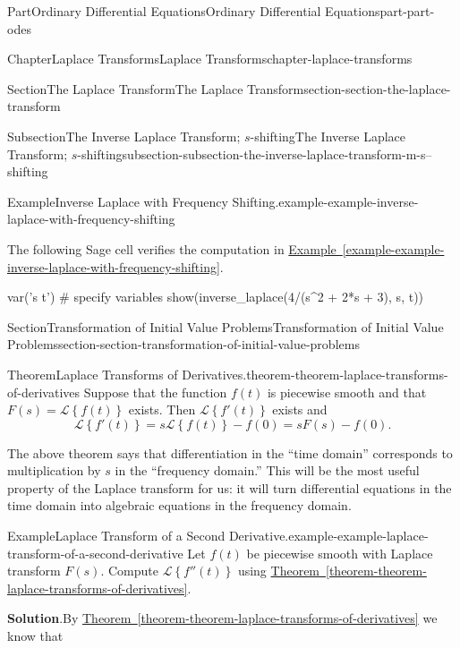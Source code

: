 \documentclass[twoside,10pt,]{book}
\newcommand{\blocktitlefont}{\relax}
\newcommand{\xreffont}{\relax}
\numberwithin{equation}{part}
\newcommand{\Laplace}[1]{\mathcal{L}\set{#1}}
\newcommand{\set}[1]{\left\{ #1 \right\}}
\begin{document}
\begin{partptx}{Part}{Ordinary Differential Equations}{}{Ordinary Differential Equations}{}{}{part-part-odes}
\begin{chapterptx}{Chapter}{Laplace Transforms}{}{Laplace Transforms}{}{}{chapter-laplace-transforms}
\begin{sectionptx}{Section}{The Laplace Transform}{}{The Laplace Transform}{}{}{section-section-the-laplace-transform}
\begin{subsectionptx}{Subsection}{The Inverse Laplace Transform; \(s\)-shifting}{}{The Inverse Laplace Transform; \(s\)-shifting}{}{}{subsection-subsection-the-inverse-laplace-transform-m-s--shifting}
\begin{example}{Example}{Inverse Laplace with Frequency Shifting.}{example-example-inverse-laplace-with-frequency-shifting}
\begin{equation*}
\end{equation*}
%
\end{example}
The following Sage cell verifies the computation in \hyperref[example-example-inverse-laplace-with-frequency-shifting]{Example~{\xreffont\ref{example-example-inverse-laplace-with-frequency-shifting}}}.%
\begin{sageinput}
var('s t') # specify variables
show(inverse_laplace(4/(s^2 + 2*s + 3), s, t))
\end{sageinput}
\end{subsectionptx}
\end{sectionptx}
%
%
\typeout{************************************************}
\typeout{************************************************}
%
\begin{sectionptx}{Section}{Transformation of Initial Value Problems}{}{Transformation of Initial Value Problems}{}{}{section-section-transformation-of-initial-value-problems}
\begin{theorem}{Theorem}{Laplace Transforms of Derivatives.}{}{theorem-theorem-laplace-transforms-of-derivatives}%
Suppose that the function \(f(t)\) is piecewise smooth and that \(F(s) = \Laplace{f(t)}\) exists. Then \(\Laplace{f'(t)}\) exists and%
\begin{equation*}
\Laplace{f'(t)} = s\Laplace{f(t)}-f(0) = sF(s)-f(0).
\end{equation*}
%
\end{theorem}
The above theorem says that differentiation in the ``time domain'' corresponds to multiplication by \(s\) in the ``frequency domain.'' This will be the most useful property of the Laplace transform for us: it will turn differential equations in the time domain into algebraic equations in the frequency domain.%
\begin{example}{Example}{Laplace Transform of a Second Derivative.}{example-example-laplace-transform-of-a-second-derivative}%
Let \(f(t)\) be piecewise smooth with Laplace transform \(F(s)\). Compute \(\Laplace{f''(t)}\) using \hyperref[theorem-theorem-laplace-transforms-of-derivatives]{Theorem~{\xreffont\ref{theorem-theorem-laplace-transforms-of-derivatives}}}.%
\par\smallskip%
\noindent\textbf{\blocktitlefont Solution}.\hypertarget{solution-example-laplace-transform-of-a-second-derivative-c}{}\quad{}By \hyperref[theorem-theorem-laplace-transforms-of-derivatives]{Theorem~{\xreffont\ref{theorem-theorem-laplace-transforms-of-derivatives}}} we know that%

\end{example}
\end{sectionptx}
\end{chapterptx}
\end{partptx}
\end{document}
